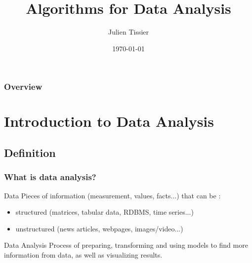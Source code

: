 \documentclass{beamer}
\title[Algorithms for Data Analysis]{Algorithms for Data Analysis}
\author{Julien Tissier}
\date{\today}
\begin{document}


\section*{\insertshortauthor} %
\subsection*{\insertshorttitle}

\begin{frame}
    \titlepage
\end{frame}

\begin{frame}
  \frametitle{Overview}
  \begin{multicols}{2}
    \tableofcontents
  \end{multicols}
\end{frame}


\section{Introduction to Data Analysis}

\subsection{Definition}
\begin{frame}
  \frametitle{What is data analysis?}
  \begin{block}{Data}
    Pieces of information (measurement, values, facts...) that can be :
    \begin{itemize}
      \item structured (matrices, tabular data, RDBMS, time series...)
      \item unstructured (news articles, webpages, images/video...)
    \end{itemize}
  \end{block}
  \begin{block}{Data Analysis}
  Process of preparing, transforming and using models to find more information
  from data, as well as visualizing results.
  \end{block}
\end{frame}
\end{document}
